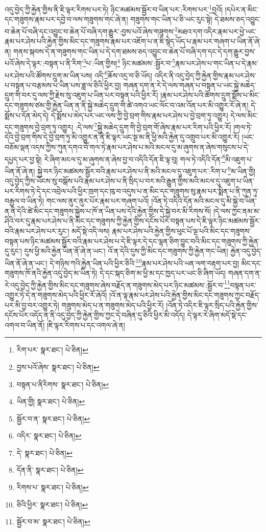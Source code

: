 འདུ་བྱེད་ཀྱི་རྐྱེན་གྱིས་ནི་ཇི་ལྟར་རིགས་པར་ཏེ། ཉིང་མཚམས་སྦྱོར་བ་ཡིན་པར་:རིགས་པར་\footnote{རིག་པར་  སྣར་ཐང་།  པེ་ཅིན། }བྱའོ། །དཔེར་ན་མིང་དང་གཟུགས་རྣམ་པར་དབྱེ་བ་ལས་གཟུགས་གང་ཞེ་ན། གཟུགས་གང་ཡིན་པ་ཅི་ཡང་རུང་སྟེ། དེ་ཐམས་ཅད་འབྱུང་བ་ཆེན་པོ་བཞི་དང་འབྱུང་བ་ཆེན་པོ་བཞི་དག་རྒྱུར་:བྱས་པའོ་ཞེས་གཟུགས་\footnote{བྱས་པའོ་ཞེས་  སྣར་ཐང་།  པེ་ཅིན། }མཐའ་དག་འདིར་རྣམ་པར་ཕྱེ་ཡང་རྣམ་པར་ཤེས་པའི་རྐྱེན་གྱིས་མིང་དང་གཟུགས་རྣམ་པར་འཇོག་པ་ན་ཇི་སྙེད་ཡོད་པ་རྣམ་པར་གཞག་པ་ཡིན་ནོ་ཞེ་ན། གནས་སྐབས་དེ་ན་གཟུགས་གང་ཡིན་པ་དེ་དག་ཐམས་ཅད་འབྱུང་བ་ཆེན་པོ་བཞི་དག་དང་དེ་དག་རྒྱུར་བྱས་པའོ་ཞེས་དེ་ལྟར་:བསྟན་པ་ནི་རིག་\footnote{བསྟན་པ་ནིརིགས་  སྣར་ཐང་།  པེ་ཅིན། }པ་:ཡིན་གྱིས།\footnote{ཡིན་གྱི།  སྣར་ཐང་།  པེ་ཅིན། } ཉིང་མཚམས་:སྦྱོར་བ་\footnote{སྦྱོར་བ་ན་  སྣར་ཐང་།  པེ་ཅིན། }རྣམ་པར་ཤེས་པ་གང་ཡིན་པ་དེ་རྣམ་པར་ཤེས་པའི་ཚོགས་དྲུག་མ་ཡིན་པས། འདི་\footnote{འདིར་  སྣར་ཐང་།  པེ་ཅིན། }ཆོས་འདྲ་བ་ཅི་ཡོད། འདིར་ནི་འདུ་བྱེད་ཀྱི་རྐྱེན་གྱིས་རྣམ་པར་ཤེས་པ་བསྟན་པ་བརྩམས་པ་ཡིན་པས་ཟླ་ལ་ཅིའི་ཕྱིར་བྱ། གཞན་དག་ན་རེ་དེ་ལས་གཞན་པ་བསྟན་པ་ཡང་སྐྱེ་མཆེད་དྲུག་གི་བར་དུ་ལས་ཀྱི་རྗེས་སུ་འཇུག་པ་ཡིན་པར་བསྟན་པའི་ཕྱིར་རོ། །རྣམ་པར་ཤེས་པའི་ཚོགས་དྲུག་སྨོས་པ་མིང་དང་གཟུགས་ཙམ་གྱི་རྐྱེན་ཡིན་ན་ནི་སྐྱེ་མཆེད་དྲུག་གི་ཚེ་འགའ་ཡང་ལོང་བ་འམ་འོན་པར་མི་འགྱུར་རོ་ཞེ་ན། དེ་སྨོས་པ་དོན་མེད་དེ། དེ་སྨོས་པ་མེད་པར་ཡང་ལས་ཀྱི་བྱེ་བྲག་གིས་རྣམ་པར་ཤེས་པ་བྱེ་བྲག་ཏུ་འགྱུར། དེ་ལས་མིང་དང་གཟུགས་བྱེ་བྲག་ཏུ་འགྱུར། :དེ་ལས་\footnote{དེ་  སྣར་ཐང་།  པེ་ཅིན། }སྐྱེ་མཆེད་དྲུག་གི་བྱེ་བྲག་གོ་ཞེས་རྣམ་པར་རིག་པའི་ཕྱིར་རོ། །གལ་ཏེ་དེའི་བྱེ་བྲག་གིས་དེ་བྱེ་བྲག་ཏུ་མི་འགྱུར་ན་ནི་ཇི་ལྟར་ཡང་སྔ་མ་ནི་ཕྱི་མའི་རྐྱེན་དུ་འགྲུབ་པར་མི་འགྱུར་རོ། །ཡང་བཅོམ་ལྡན་འདས་ཀྱིས་ཀུན་དགའ་བོ་གལ་ཏེ་རྣམ་པར་ཤེས་པ་མའི་མངལ་དུ་མ་ཞུགས་ན་ཞེས་གསུངས་པ་དེ་དཔྱད་པར་བྱ་སྟེ། རེ་ཞིག་མངལ་དུ་མ་ཞུགས་ན་ཞེས་བྱ་བ་འདིའི་དོན་ཇི་ལྟ་བུ། གལ་ཏེ་འདིའི་དོན་\footnote{དོན་ནི་  སྣར་ཐང་།  པེ་ཅིན། }མི་འཇུག་པ་ཡིན་ནོ་ཞེ་ན། སྐྱེ་བར་ཉིང་མཚམས་སྦྱོར་བའི་རྣམ་པར་ཤེས་པ་ནི་མའི་མངལ་དུ་འཇུག་པར་:རིག་པ་\footnote{རིགས་པ་  སྣར་ཐང་།  པེ་ཅིན། }མ་ཡིན་གྱི། འདུ་བྱེད་ཀྱིས་ཡོངས་སུ་བསྒོས་པའི་རྣམ་པར་ཤེས་པ་ནི་སྲིད་པ་བར་མའི་རྒྱུན་གྱིས་མའི་མངལ་དུ་འཇུག་པ་ཡིན་པར་རིགས་ཏེ་དེ་དང་འབྲེལ་པའི་ཕྱིར་ཁྲག་དང་ཁུ་བ་འདུས་པ་ན་མིང་དང་གཟུགས་སུ་རྣམ་པར་སྨིན་པ་ནི་ཀུན་ཏུ་བརྒྱལ་བ་ཡིན་ཏེ། གང་ལས་ནུར་ནུར་པོར་རྣམ་པར་གཞག་པའོ། །འོན་ཏེ་འདིའི་དོན་མའི་མངལ་དུ་མི་སྐྱེ་བ་ཡིན་ན་ནི་དེའི་ཚེ་མིང་དང་གཟུགས་སྐྱེས་པ་ཁོ་ན་ཡིན་པས་དེའི་རྐྱེན་གྱིས་དེ་སྐྱེ་བར་མི་རིགས་སོ། །དེ་ལས་ཀྱང་ནམ་མ་ཤིའི་བར་དུ་རྣམ་པར་ཤེས་པ་ནི་མིང་དང་གཟུགས་ཀྱི་རྐྱེན་གྱིས་དངོས་པོར་བསྟན་པས་དེ་ཇི་ལྟར་ཉིང་མཚམས་སྦྱོར་བའི་རྣམ་པར་ཤེས་པར་རུང་། མདོ་སྡེ་འདི་ལས། རྣམ་པར་ཤེས་པའི་རྐྱེན་གྱིས་ཕུང་པོ་ལྔ་པའི་མིང་དང་གཟུགས་བསྟན་པས་ཉིང་མཚམས་སྦྱོར་བའི་རྣམ་པར་ཤེས་པ་དེ་ཇི་ལྟར་དེ་དང་ལྷན་ཅིག་བྱུང་བའི་མིང་དང་གཟུགས་ཀྱི་རྐྱེན་དུ་རུང་། དུས་ཕྱི་མའི་རྐྱེན་ཡིན་ནོ་ཞེ་ན་ཡང་། འོ་ན་དེའི་དུས་ཀྱི་མིང་དང་གཟུགས་ཀྱི་རྐྱེན་གང་ཡིན། རྐྱེན་འདུ་བྱེད་ཡིན་ནོ་ཞེ་ན་ཡང་། དེ་གཉིས་ཀའི་རྐྱེན་ཡིན་པའི་ཕྱིར་ཅིའི་\footnote{ཅིའི་ཕྱིར་  སྣར་ཐང་།  པེ་ཅིན། }རྣམ་པར་ཤེས་པའི་ཡན་ལག་བརྟག་པར་བྱ། མིང་དང་གཟུགས་ཁོ་ནའི་རྐྱེན་འདུ་བྱེད་མ་ཡིན་ཏེ། དེ་དང་སྐད་ཅིག་མ་ཕྱི་མ་དང་ཁྱད་པར་ཡང་ཅི་ཞིག་ཡོད། གཞན་དག་ན་རེ་འདུ་བྱེད་ཀྱི་རྐྱེན་གྱིས་མིང་དང་གཟུགས་ཞེས་བརྗོད་ན་གཟུགས་མེད་པར་ཉིང་མཚམས་:སྦྱོར་བ་\footnote{སྦྱོར་བ་མ་  སྣར་ཐང་།  པེ་ཅིན། }བསྟན་པར་འགྱུར་ཏེ་དེ་ན་གཟུགས་མེད་པའི་ཕྱིར་རོ་ཞེའོ། །འོ་ན་ལྟ་རྣམ་པར་ཤེས་པའི་རྐྱེན་གྱིས་མིང་དང་གཟུགས་ཀྱང་བརྗོད་པར་མི་བྱ་བར་འགྱུར་ཏེ། གཟུགས་མེད་པ་ན་གཟུགས་མེད་པའི་ཕྱིར་རོ། །འོན་ཏེ་འདིར་ཇི་ལྟར་སྲིད་པའི་རྐྱེན་གྱིས་དངོས་པོར་འདོད་ན་ནི་འདུ་བྱེད་ཀྱི་རྐྱེན་གྱིས་ཀྱང་དེ་བཞིན་དུ་ཅིའི་ཕྱིར་མི་འདོད། དེ་ལྟར་རེ་ཞིག་མདོ་སྡེ་དང་འགལ་བ་ཡིན་ནོ། །ཇི་ལྟར་རིགས་པ་དང་འགལ་ཞེ་ན། 